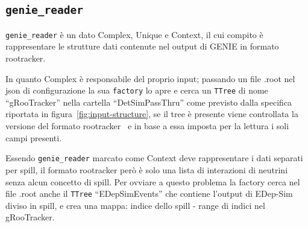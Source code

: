 \documentclass[../../main.tex]{subfiles}
\begin{document}
\subsection*{\texttt{genie\_reader}}
  \texttt{genie\_reader} è un dato Complex, Unique e Context, il cui compito
  è rappresentare le strutture dati contenute nel output di GENIE in formato
  rootracker.

  In quanto Complex è responsabile del proprio input; passando un file .root
  nel json di configurazione la sua \texttt{factory} lo apre e cerca un
  \texttt{TTree} di nome ``gRooTracker'' nella cartella ``DetSimPassThru''
  come previsto dalla specifica riportata in figura~\ref{fig:input-structure},
  se il tree è presente viene controllata la versione del formato
  rootracker~\cite[pag. 116]{Andreopoulos_2015} e in base a essa imposta per
  la lettura i soli campi presenti.

  Essendo \texttt{genie\_reader} marcato come Context deve rappresentare i
  dati separati per spill, il formato rootracker però è solo una lista di
  interazioni di neutrini senza alcun concetto di spill.
  Per ovviare a questo problema la factory cerca nel file .root anche il
  \texttt{TTree} ``EDepSimEvents'' che contiene l'output di EDep-Sim diviso
  in spill, e crea una mappa: indice dello spill - range di indici nel
  gRooTracker.
\end{document}
